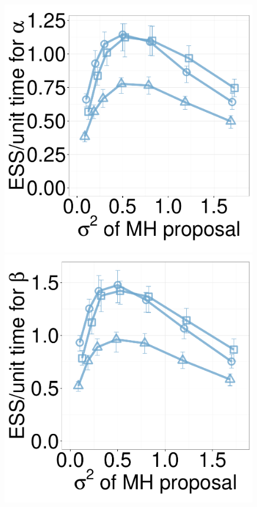 \begin{figure}[H]
\begin{minipage}[hp]{0.24\linewidth}
	\end{minipage}
  \begin{minipage}[hp]{0.24\linewidth}
  \centering
    \includegraphics [width=0.99\textwidth, angle=0]{figs/new_whole_exp_figs/mh_exp_alpha_dim10.pdf}
	\end{minipage}
  \begin{minipage}[hp]{0.24\linewidth}
  \centering
    \includegraphics [width=0.99\textwidth, angle=0]{figs/new_whole_exp_figs/mh_exp_beta_dim10.pdf}

\end{minipage}
\end{figure}
